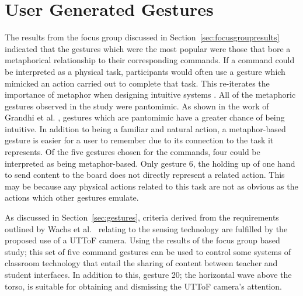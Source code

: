 \documentclass[manuscript, review, screen]{acmart}
\begin{document}



\section{User Generated Gestures}
\label{sec:discussion}

The results from the focus group discussed in Section~\ref{sec:focusgroupresults} indicated that the gestures which were the most popular were those that bore a metaphorical relationship to their corresponding commands.
If a command could be interpreted as a physical task, participants would often use a gesture which mimicked an action carried out to complete that task.
This re-iterates the importance of metaphor when designing intuitive systems \cite{Wang2008}.
All of the metaphoric gestures observed in the study were pantomimic.
As shown in the work of Grandhi et al. \citeyearpar{Grandhi2011}, gestures which are pantomimic have a greater chance of being intuitive.
In addition to being a familiar and natural action, a metaphor-based gesture is easier for a user to remember due to its connection to the task it represents.
Of the five gestures chosen for the commands, four could be interpreted as being metaphor-based.
Only gesture 6, the holding up of one hand to send content to the board does not directly represent a related action.
This may be because any physical actions related to this task are not as obvious as the actions which other gestures emulate.

As discussed in Section~\ref{sec:gestures}, criteria derived from the requirements outlined by Wachs et al.~\citeyearpar{Wachs2011} relating to the sensing technology are fulfilled by the proposed use of a \ac{UTToF} camera.
Using the results of the focus group based study; this set of five command gestures can be used to control some systems of classroom technology that entail the sharing of content between teacher and student interfaces.
In addition to this, gesture 20; the horizontal wave above the torso, is suitable for obtaining and dismissing the \ac{UTToF} camera's attention.
\end{document}
